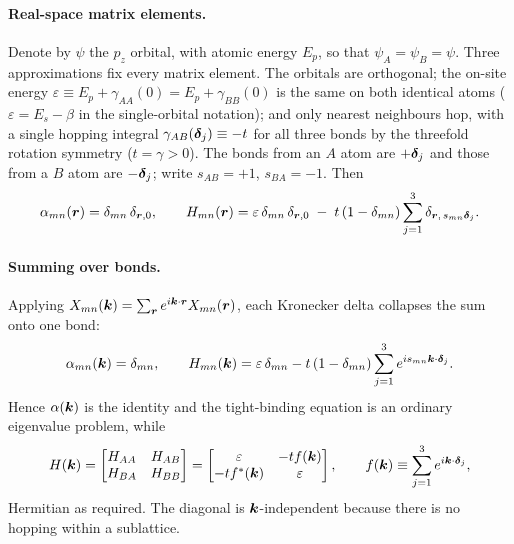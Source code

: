 \paragraph{Real-space matrix elements.} Denote by $\psi$ the $p_z$ orbital, with atomic energy $E_p$, so that $\psi_A=\psi_B=\psi$. Three approximations fix every matrix element. The orbitals are orthogonal; the on-site energy $\varepsilon\equiv E_p+\gamma_{AA}(0)=E_p+\gamma_{BB}(0)$ is the same on both identical atoms ($\varepsilon=E_s-\beta$ in the single-orbital notation); and only nearest neighbours hop, with a single hopping integral $\gamma_{AB}(\bm{\delta}_j)\equiv-t$ for all three bonds by the threefold rotation symmetry ($t=\gamma>0$). The bonds from an $A$ atom are $+\bm{\delta}_j$ and those from a $B$ atom are $-\bm{\delta}_j$; write $s_{AB}=+1$, $s_{BA}=-1$. Then
\begin{equation}
    \alpha_{mn}(\bm{r}) = \delta_{mn}\,\delta_{\bm{r},0},
    \qquad
    H_{mn}(\bm{r}) = \varepsilon\,\delta_{mn}\,\delta_{\bm{r},0} \;-\; t\,(1-\delta_{mn})\sum_{j=1}^{3}\delta_{\bm{r},\,s_{mn}\bm{\delta}_j}.
\end{equation}

\paragraph{Summing over bonds.} Applying $X_{mn}(\bm{k})=\sum_{\bm{r}}e^{i\bm{k}\cdot\bm{r}}X_{mn}(\bm{r})$, each Kronecker delta collapses the sum onto one bond:
\begin{equation}
    \alpha_{mn}(\bm{k}) = \delta_{mn},
    \qquad
    H_{mn}(\bm{k}) = \varepsilon\,\delta_{mn} - t\,(1-\delta_{mn})\sum_{j=1}^{3} e^{i s_{mn}\bm{k}\cdot\bm{\delta}_j}.
\end{equation}
Hence $\alpha(\bm{k})$ is the identity and the tight-binding equation is an ordinary eigenvalue problem, while
\begin{equation}
    H(\bm{k}) = \begin{bmatrix} H_{AA} & H_{AB} \\ H_{BA} & H_{BB} \end{bmatrix}
    = \begin{bmatrix} \varepsilon & -t f(\bm{k}) \\ -t f^*(\bm{k}) & \varepsilon \end{bmatrix},
    \qquad f(\bm{k})\equiv\sum_{j=1}^3 e^{i\bm{k}\cdot\bm{\delta}_j},
\end{equation}
Hermitian as required. The diagonal is $\bm{k}$-independent because there is no hopping within a sublattice.

